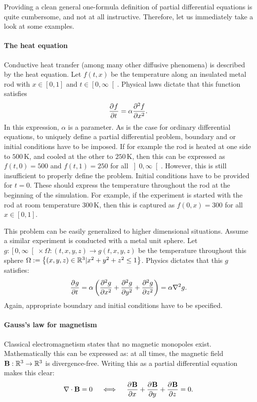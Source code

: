 Providing a clean general one-formula definition of partial differential equations is quite cumbersome, and not at all instructive. Therefore, let us immediately take a look at some examples.

\paragraph{The heat equation} Conductive heat transfer (among many other diffusive phenomena) is described by the heat equation. Let $f(t, x)$ be the temperature along an insulated metal rod with $x \in [0, 1]$ and $t \in \left[0, \infty\right[$. Physical laws dictate that this function satisfies
$$
    {\pdv[]{f}{t}} = \alpha \pdv[2]{f}{x}\text{.}
$$
In this expression, $\alpha$ is a parameter. As is the case for ordinary differential equations, to uniquely define a partial differential problem, boundary and or initial conditions have to be imposed. If for example the rod is heated at one side to $500\,\text{K}$, and cooled at the other to $250\,\text{K}$, then this can be expressed as $f(t, 0) = 500$ and $f(t, 1)=250$ for all $\left]0, \infty\right[$. However, this is still insufficient to properly define the problem. Initial conditions have to be provided for $t=0$. These should express the temperature throughout the rod at the beginning of the simulation. For example, if the experiment is started with the rod at room temperature $300\,\text{K}$, then this is captured as $f(0, x) = 300$ for all $x \in [0, 1]$.

This problem can be easily generalized to higher dimensional situations. Assume a similar experiment is conducted with a metal unit sphere. Let $g : \left[0, \infty\right[ \times \Omega : (t, x, y, z) \to g(t, x, y, z)$ be the temperature throughout this sphere $\Omega := \left\{(x, y, z) \in \mathbb{R}^3 | x^2 + y^2 + z^2 \leq 1\right\}$. Physics dictates that this $g$ satisfies:
$$
{\pdv[]{g}{t}} = \alpha\left(\pdv[2]{g}{x} + \pdv[2]{g}{y} + \pdv[2]{g}{z}\right) = \alpha \nabla^2 g \text{.}
$$
Again, appropriate boundary and initial conditions have to be specified.

\paragraph{Gauss's law for magnetism} Classical electromagnetism states that no magnetic monopoles exist. Mathematically this can be expressed as: at all times, the magnetic field $\vb{B} : \mathbb{R}^3 \to \mathbb{R}^3$ is divergence-free. Writing this as a partial differential equation makes this clear:
\begin{equation}\label{equ:c1_gauss_magnets}
    \nabla \cdot \vb{B} = 0 \quad\iff\quad \pdv[]{\vb{B}}{x} + \pdv[]{\vb{B}}{y} + \pdv[]{\vb{B}}{z} = 0\text{.}    
\end{equation}

